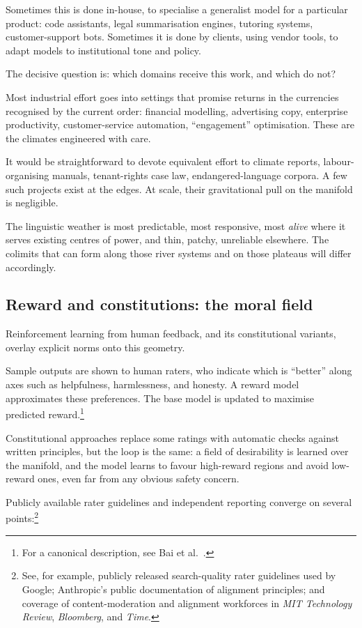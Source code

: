 Sometimes this is done in-house, to specialise a generalist model for a particular product: code assistants, legal summarisation engines, tutoring systems, customer-support bots. Sometimes it is done by clients, using vendor tools, to adapt models to institutional tone and policy.

The decisive question is: which domains receive this work, and which do not?

Most industrial effort goes into settings that promise returns in the currencies recognised by the current order: financial modelling, advertising copy, enterprise productivity, customer-service automation, ``engagement'' optimisation. These are the climates engineered with care.

It would be straightforward to devote equivalent effort to climate reports, labour-organising manuals, tenant-rights case law, endangered-language corpora. A few such projects exist at the edges. At scale, their gravitational pull on the manifold is negligible.

The linguistic weather is most predictable, most responsive, most \emph{alive} where it serves existing centres of power, and thin, patchy, unreliable elsewhere. The colimits that can form along those river systems and on those plateaus will differ accordingly.

\subsection{Reward and constitutions: the moral field}

Reinforcement learning from human feedback, and its constitutional variants, overlay explicit norms onto this geometry.

Sample outputs are shown to human raters, who indicate which is ``better'' along axes such as helpfulness, harmlessness, and honesty. A reward model approximates these preferences. The base model is updated to maximise predicted reward.\footnote{For a canonical description, see Bai et al.\ \cite{bai2022constitutional}.}

Constitutional approaches replace some ratings with automatic checks against written principles, but the loop is the same: a field of desirability is learned over the manifold, and the model learns to favour high-reward regions and avoid low-reward ones, even far from any obvious safety concern.

Publicly available rater guidelines and independent reporting converge on several points:\footnote{See, for example, publicly released search-quality rater guidelines used by Google; Anthropic's public documentation of alignment principles; and coverage of content-moderation and alignment workforces in \emph{MIT Technology Review}, \emph{Bloomberg}, and \emph{Time}.}

